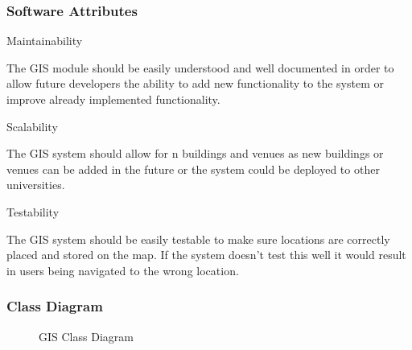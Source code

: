 \subsubsection{Software Attributes}
	
Maintainability

The GIS module should be easily understood and well documented in order to allow future developers the ability to add new functionality to the system or improve already implemented functionality.

Scalability

The GIS system should allow for n buildings and venues as new buildings or venues can be added in the future or the system could be deployed to other universities.

Testability

The GIS system should be easily testable to make sure locations are correctly placed and stored on the map. If the system doesn't test this well it would result in users being navigated to the wrong location.

\subsubsection{Class Diagram}

	\begin{figure}[h!]


\caption{GIS Class Diagram}

	\end{figure}
